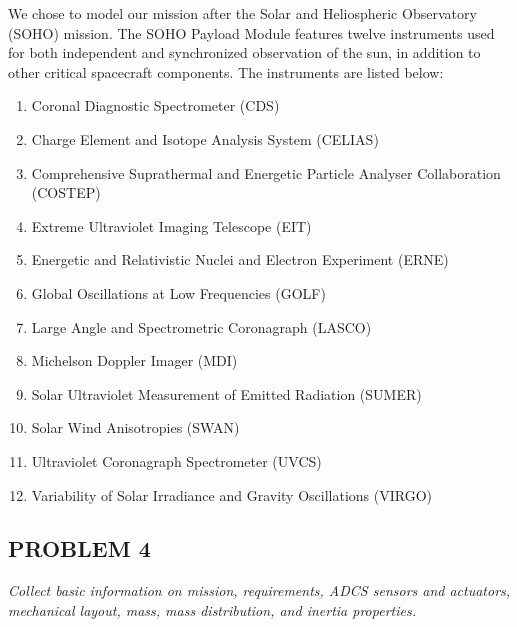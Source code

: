 \documentclass[12pt,a4paper,notitlepage]{article}
\begin{document}
We chose to model our mission after the Solar and Heliospheric Observatory (SOHO) mission. The SOHO Payload Module features twelve instruments used for both independent and synchronized observation of the sun, in addition to other critical spacecraft components. The instruments are listed below:
\begin{enumerate}
    \item Coronal Diagnostic Spectrometer (CDS)
    \newline
    \item Charge Element and Isotope Analysis System (CELIAS)
    \newline
    \item Comprehensive Suprathermal and Energetic Particle Analyser Collaboration (COSTEP)
    \newline
    \item Extreme Ultraviolet Imaging Telescope (EIT)
    \newline
    \item Energetic and Relativistic Nuclei and Electron Experiment (ERNE)
    \newline
    \item Global Oscillations at Low Frequencies (GOLF)
    \newline
    \item Large Angle and Spectrometric Coronagraph (LASCO)
    \newline
    \item Michelson Doppler Imager (MDI)
    \newline
    \item Solar Ultraviolet Measurement of Emitted Radiation (SUMER)
    \newline
    \item Solar Wind Anisotropies (SWAN)
    \newline
    \item Ultraviolet Coronagraph Spectrometer (UVCS)
    \newline
    \item Variability of Solar Irradiance and Gravity
    Oscillations (VIRGO)
    \newline
\end{enumerate}

\subsection{PROBLEM 4}
\textit{Collect basic information on mission, requirements, ADCS sensors and actuators, mechanical layout, mass,
mass distribution, and inertia properties.}
\end{document}
